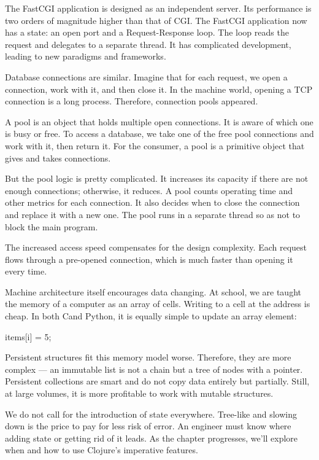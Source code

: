 The FastCGI application is designed as an independent server. Its performance is two orders of magnitude higher than that of CGI.
The FastCGI application now has a state: an open port and a Request-Response loop.
The loop reads the request and delegates to a separate thread.
It has complicated development, leading to new paradigms and frameworks.

Database connections are similar.
Imagine that for each request, we open a connection, work with it, and then close it.
In the machine world, opening a TCP connection is a long process.
Therefore, connection pools appeared.


A pool is an object that holds multiple open connections.
It is aware of which one is busy or free.
To access a database, we take one of the free pool connections and work with it, then return it.
For the consumer, a pool is a primitive object that gives and takes connections.

But the pool logic is pretty complicated.
It increases its capacity if there are not enough connections; otherwise, it reduces. A pool counts operating time and other metrics for each connection. It also decides when to close the connection and replace it with a new one.
The pool runs in a separate thread so as not to block the main program.

The increased access speed compensates for the design complexity.
Each request flows through a pre-opened connection, which is much faster than opening it every time.

Machine architecture itself encourages data changing. At school, we are taught the memory of a computer as an array of cells.
Writing to a cell at the address is cheap.
In both C\Plus\Plus and Python, it is equally simple to update an array element:

\begin{python}
items[i] = 5;
\end{python}

Persistent structures fit this memory model worse.
Therefore, they are more complex — an immutable list is not a chain but a tree of nodes with a pointer.
Persistent collections are smart and do not copy data entirely but partially.
Still, at large volumes, it is more profitable to work with mutable structures.

We do not call for the introduction of state everywhere.
Tree-like and slowing down is the price to pay for less risk of error.
An engineer must know where adding state or getting rid of it leads.
As the chapter progresses, we'll explore when and how to use Clojure's imperative features.

